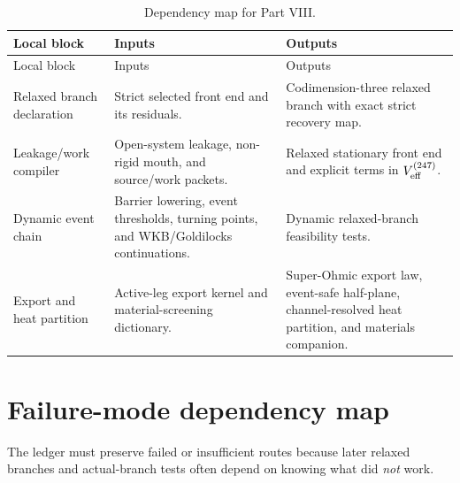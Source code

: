 \begin{longtable}{L{0.18\textwidth}L{0.29\textwidth}L{0.35\textwidth}}
\caption{Dependency map for Part VIII.}\label{tab:dep-part-viii}\\
\toprule
Local block & Inputs & Outputs \\
\midrule
\endfirsthead
\toprule
Local block & Inputs & Outputs \\
\midrule
\endhead
Relaxed branch declaration & Strict selected front end and its residuals. & Codimension-three relaxed branch with exact strict recovery map. \\
\addlinespace
Leakage/work compiler & Open-system leakage, non-rigid mouth, and source/work packets. & Relaxed stationary front end and explicit terms in \(V_{\rm eff}^{(247)}\). \\
\addlinespace
Dynamic event chain & Barrier lowering, event thresholds, turning points, and WKB/Goldilocks continuations. & Dynamic relaxed-branch feasibility tests. \\
\addlinespace
Export and heat partition & Active-leg export kernel and material-screening dictionary. & Super-Ohmic export law, event-safe half-plane, channel-resolved heat partition, and materials companion. \\
\bottomrule
\end{longtable}

\section{Failure-mode dependency map}
\label{sec:failure-mode-dependency-map}

The ledger must preserve failed or insufficient routes because later relaxed branches and actual-branch tests often depend on knowing what did \emph{not} work.

